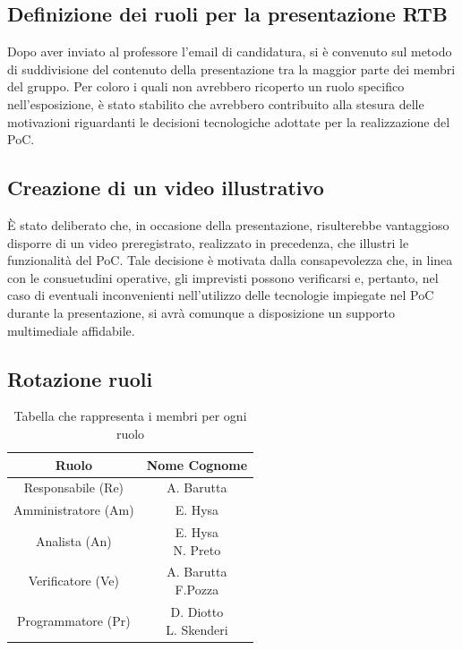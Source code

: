 \documentclass{article}
\begin{document}
\subsection{Definizione dei ruoli per la presentazione RTB}
Dopo aver inviato al professore l'email di candidatura, si è convenuto sul metodo di suddivisione del contenuto della presentazione tra la maggior parte dei membri del gruppo. Per coloro i quali non avrebbero ricoperto un ruolo specifico nell'esposizione, è stato stabilito che avrebbero contribuito alla stesura delle motivazioni riguardanti le decisioni tecnologiche adottate per la realizzazione del PoC.

\subsection{Creazione di un video illustrativo }
È stato deliberato che, in occasione della presentazione, risulterebbe vantaggioso disporre di un video preregistrato, realizzato in precedenza, che illustri le funzionalità del PoC. Tale decisione è motivata dalla consapevolezza che, in linea con le consuetudini operative, gli imprevisti possono verificarsi e, pertanto, nel caso di eventuali inconvenienti nell'utilizzo delle tecnologie impiegate nel PoC durante la presentazione, si avrà comunque a disposizione un supporto multimediale affidabile.

\subsection{Rotazione ruoli}
    \begin{table}[H]
        \centering
        \begin{tabular}{|c|c|} 
            \hline
            \textbf{Ruolo} & \textbf{Nome Cognome} \\
            \hline \hline
            Responsabile (Re) & A. Barutta \\ 
            \hline
            Amministratore (Am) & E. Hysa \\ 
            \hline
            Analista (An) & \makecell{E. Hysa\\N. Preto} \\
            \hline
            Verificatore (Ve) & \makecell{A. Barutta\\F.Pozza} \\
            \hline
            Programmatore (Pr) & \makecell{D. Diotto\\L. Skenderi} \\
            \hline
        \end{tabular}
        \caption{Tabella che rappresenta i membri per ogni ruolo}
    \end{table}
\end{document}
